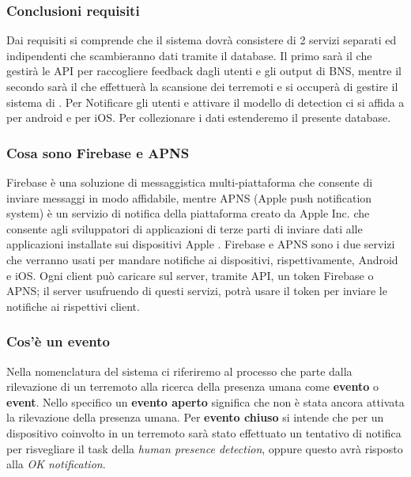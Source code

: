 \documentclass[main.tex]{subfiles}
\begin{document}
\subsubsection{Conclusioni requisiti}
Dai requisiti si comprende che il sistema dovrà consistere di 2 servizi separati ed indipendenti che scambieranno dati tramite il database. Il primo sarà il  che gestirà le API per raccogliere feedback dagli utenti e gli output di BNS, mentre il secondo sarà il  che effettuerà la scansione dei terremoti e si occuperà di gestire il sistema di .\newline
Per Notificare gli utenti e attivare il modello di detection ci si affida a  per android e  per iOS. \newline
Per collezionare i dati estenderemo il presente database.

\subsubsection{Cosa sono Firebase e APNS}\label{sec:firebase&apns}
Firebase è una soluzione di messaggistica multi-piattaforma che consente di inviare messaggi in modo affidabile\cite{firebase}, mentre APNS (Apple push notification system) è un servizio di notifica della piattaforma creato da Apple Inc. che consente agli sviluppatori di applicazioni di terze parti di inviare dati alle applicazioni installate sui dispositivi Apple \cite{APNS}.\newline
Firebase e APNS sono i due servizi che verranno usati per mandare notifiche ai dispositivi, rispettivamente, Android e iOS. Ogni client può caricare sul server, tramite API, un token Firebase o APNS; il server usufruendo di questi servizi, potrà usare il token per inviare le notifiche ai rispettivi client.

\subsubsection{Cos'è un evento} \label{sec:evento}
Nella nomenclatura del sistema ci riferiremo al processo che parte dalla rilevazione di un terremoto alla ricerca della presenza umana come \textbf{evento} o \textbf{event}. Nello specifico un \textbf{evento aperto} significa che non è stata ancora attivata la rilevazione della presenza umana. Per \textbf{evento chiuso} si intende che per un dispositivo coinvolto in un terremoto sarà stato effettuato un tentativo di notifica per risvegliare il task della \emph{human presence detection}, oppure questo avrà risposto alla \emph{OK notification}.
\end{document}
